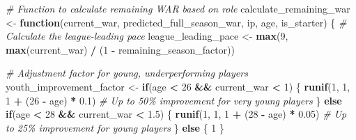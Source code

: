 \documentclass[
]{article}
\newenvironment{Shaded}{\begin{snugshade}}{\end{snugshade}}
\newcommand{\CommentTok}[1]{\textcolor[rgb]{0.56,0.35,0.01}{\textit{#1}}}
\newcommand{\ControlFlowTok}[1]{\textcolor[rgb]{0.13,0.29,0.53}{\textbf{#1}}}
\newcommand{\DecValTok}[1]{\textcolor[rgb]{0.00,0.00,0.81}{#1}}
\newcommand{\FloatTok}[1]{\textcolor[rgb]{0.00,0.00,0.81}{#1}}
\newcommand{\FunctionTok}[1]{\textcolor[rgb]{0.13,0.29,0.53}{\textbf{#1}}}
\newcommand{\NormalTok}[1]{#1}
\newcommand{\OtherTok}[1]{\textcolor[rgb]{0.56,0.35,0.01}{#1}}
\newcommand{\SpecialCharTok}[1]{\textcolor[rgb]{0.81,0.36,0.00}{\textbf{#1}}}
\begin{document}
\begin{Shaded}
\begin{Highlighting}[]
\CommentTok{\# Function to calculate remaining WAR based on role}
\NormalTok{calculate\_remaining\_war }\OtherTok{\textless{}{-}} \ControlFlowTok{function}\NormalTok{(current\_war, predicted\_full\_season\_war, ip, age, is\_starter) \{}
  \CommentTok{\# Calculate the league{-}leading pace}
\NormalTok{  league\_leading\_pace }\OtherTok{\textless{}{-}} \FunctionTok{max}\NormalTok{(}\DecValTok{9}\NormalTok{, }\FunctionTok{max}\NormalTok{(current\_war) }\SpecialCharTok{/}\NormalTok{ (}\DecValTok{1} \SpecialCharTok{{-}}\NormalTok{ remaining\_season\_factor))}
  
  \CommentTok{\# Adjustment factor for young, underperforming players}
\NormalTok{  youth\_improvement\_factor }\OtherTok{\textless{}{-}} \ControlFlowTok{if}\NormalTok{(age }\SpecialCharTok{\textless{}} \DecValTok{26} \SpecialCharTok{\&\&}\NormalTok{ current\_war }\SpecialCharTok{\textless{}} \DecValTok{1}\NormalTok{) \{}
    \FunctionTok{runif}\NormalTok{(}\DecValTok{1}\NormalTok{, }\DecValTok{1}\NormalTok{, }\DecValTok{1} \SpecialCharTok{+}\NormalTok{ (}\DecValTok{26} \SpecialCharTok{{-}}\NormalTok{ age) }\SpecialCharTok{*} \FloatTok{0.1}\NormalTok{)  }\CommentTok{\# Up to 50\% improvement for very young players}
\NormalTok{  \} }\ControlFlowTok{else} \ControlFlowTok{if}\NormalTok{(age }\SpecialCharTok{\textless{}} \DecValTok{28} \SpecialCharTok{\&\&}\NormalTok{ current\_war }\SpecialCharTok{\textless{}} \FloatTok{1.5}\NormalTok{) \{}
    \FunctionTok{runif}\NormalTok{(}\DecValTok{1}\NormalTok{, }\DecValTok{1}\NormalTok{, }\DecValTok{1} \SpecialCharTok{+}\NormalTok{ (}\DecValTok{28} \SpecialCharTok{{-}}\NormalTok{ age) }\SpecialCharTok{*} \FloatTok{0.05}\NormalTok{)  }\CommentTok{\# Up to 25\% improvement for young players}
\NormalTok{  \} }\ControlFlowTok{else}\NormalTok{ \{}
    \DecValTok{1}
\NormalTok{  \}}
  

\end{Highlighting}
\end{Shaded}
\end{document}
